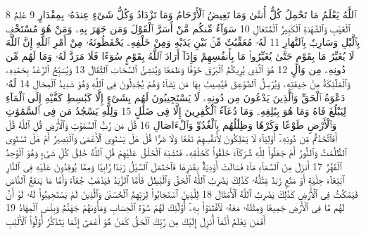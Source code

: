 {\tiny\colorbox{cl_aya}{8}} ٱللَّهُ يَعْلَمُ مَا تَحْمِلُ كُلُّ أُنثَىٰ وَمَا تَغِيضُ ٱلْأَرْحَامُ وَمَا تَزْدَادُ وَكُلُّ شَىْءٍ عِندَهُۥ بِمِقْدَارٍ
{\tiny\colorbox{cl_aya}{9}} عَٰلِمُ ٱلْغَيْبِ وَٱلشَّهَٰدَةِ ٱلْكَبِيرُ ٱلْمُتَعَالِ
{\tiny\colorbox{cl_aya}{10}} سَوَآءٌ مِّنكُم مَّنْ أَسَرَّ ٱلْقَوْلَ وَمَن جَهَرَ بِهِۦ وَمَنْ هُوَ مُسْتَخْفٍۭ بِٱلَّيْلِ وَسَارِبٌۢ بِٱلنَّهَارِ
{\tiny\colorbox{cl_aya}{11}} لَهُۥ مُعَقِّبَٰتٌ مِّنۢ بَيْنِ يَدَيْهِ وَمِنْ خَلْفِهِۦ يَحْفَظُونَهُۥ مِنْ أَمْرِ ٱللَّهِ إِنَّ ٱللَّهَ لَا يُغَيِّرُ مَا بِقَوْمٍ حَتَّىٰ يُغَيِّرُوا۟ مَا بِأَنفُسِهِمْ وَإِذَآ أَرَادَ ٱللَّهُ بِقَوْمٍ سُوٓءًا فَلَا مَرَدَّ لَهُۥ وَمَا لَهُم مِّن دُونِهِۦ مِن وَالٍ
{\tiny\colorbox{cl_aya}{12}} هُوَ ٱلَّذِى يُرِيكُمُ ٱلْبَرْقَ خَوْفًا وَطَمَعًا وَيُنشِئُ ٱلسَّحَابَ ٱلثِّقَالَ
{\tiny\colorbox{cl_aya}{13}} وَيُسَبِّحُ ٱلرَّعْدُ بِحَمْدِهِۦ وَٱلْمَلَٰٓئِكَةُ مِنْ خِيفَتِهِۦ وَيُرْسِلُ ٱلصَّوَٰعِقَ فَيُصِيبُ بِهَا مَن يَشَآءُ وَهُمْ يُجَٰدِلُونَ فِى ٱللَّهِ وَهُوَ شَدِيدُ ٱلْمِحَالِ
{\tiny\colorbox{cl_aya}{14}} لَهُۥ دَعْوَةُ ٱلْحَقِّ وَٱلَّذِينَ يَدْعُونَ مِن دُونِهِۦ لَا يَسْتَجِيبُونَ لَهُم بِشَىْءٍ إِلَّا كَبَٰسِطِ كَفَّيْهِ إِلَى ٱلْمَآءِ لِيَبْلُغَ فَاهُ وَمَا هُوَ بِبَٰلِغِهِۦ وَمَا دُعَآءُ ٱلْكَٰفِرِينَ إِلَّا فِى ضَلَٰلٍ
{\tiny\colorbox{cl_aya}{15}} وَلِلَّهِ يَسْجُدُ مَن فِى ٱلسَّمَٰوَٰتِ وَٱلْأَرْضِ طَوْعًا وَكَرْهًا وَظِلَٰلُهُم بِٱلْغُدُوِّ وَٱلْءَاصَالِ
{\tiny\colorbox{cl_aya}{16}} قُلْ مَن رَّبُّ ٱلسَّمَٰوَٰتِ وَٱلْأَرْضِ قُلِ ٱللَّهُ قُلْ أَفَٱتَّخَذْتُم مِّن دُونِهِۦٓ أَوْلِيَآءَ لَا يَمْلِكُونَ لِأَنفُسِهِمْ نَفْعًا وَلَا ضَرًّا قُلْ هَلْ يَسْتَوِى ٱلْأَعْمَىٰ وَٱلْبَصِيرُ أَمْ هَلْ تَسْتَوِى ٱلظُّلُمَٰتُ وَٱلنُّورُ أَمْ جَعَلُوا۟ لِلَّهِ شُرَكَآءَ خَلَقُوا۟ كَخَلْقِهِۦ فَتَشَٰبَهَ ٱلْخَلْقُ عَلَيْهِمْ قُلِ ٱللَّهُ خَٰلِقُ كُلِّ شَىْءٍ وَهُوَ ٱلْوَٰحِدُ ٱلْقَهَّٰرُ
{\tiny\colorbox{cl_aya}{17}} أَنزَلَ مِنَ ٱلسَّمَآءِ مَآءً فَسَالَتْ أَوْدِيَةٌۢ بِقَدَرِهَا فَٱحْتَمَلَ ٱلسَّيْلُ زَبَدًا رَّابِيًا وَمِمَّا يُوقِدُونَ عَلَيْهِ فِى ٱلنَّارِ ٱبْتِغَآءَ حِلْيَةٍ أَوْ مَتَٰعٍ زَبَدٌ مِّثْلُهُۥ كَذَٰلِكَ يَضْرِبُ ٱللَّهُ ٱلْحَقَّ وَٱلْبَٰطِلَ فَأَمَّا ٱلزَّبَدُ فَيَذْهَبُ جُفَآءً وَأَمَّا مَا يَنفَعُ ٱلنَّاسَ فَيَمْكُثُ فِى ٱلْأَرْضِ كَذَٰلِكَ يَضْرِبُ ٱللَّهُ ٱلْأَمْثَالَ
{\tiny\colorbox{cl_aya}{18}} لِلَّذِينَ ٱسْتَجَابُوا۟ لِرَبِّهِمُ ٱلْحُسْنَىٰ وَٱلَّذِينَ لَمْ يَسْتَجِيبُوا۟ لَهُۥ لَوْ أَنَّ لَهُم مَّا فِى ٱلْأَرْضِ جَمِيعًا وَمِثْلَهُۥ مَعَهُۥ لَٱفْتَدَوْا۟ بِهِۦٓ أُو۟لَٰٓئِكَ لَهُمْ سُوٓءُ ٱلْحِسَابِ وَمَأْوَىٰهُمْ جَهَنَّمُ وَبِئْسَ ٱلْمِهَادُ
{\tiny\colorbox{cl_aya}{19}} أَفَمَن يَعْلَمُ أَنَّمَآ أُنزِلَ إِلَيْكَ مِن رَّبِّكَ ٱلْحَقُّ كَمَنْ هُوَ أَعْمَىٰٓ إِنَّمَا يَتَذَكَّرُ أُو۟لُوا۟ ٱلْأَلْبَٰبِ
